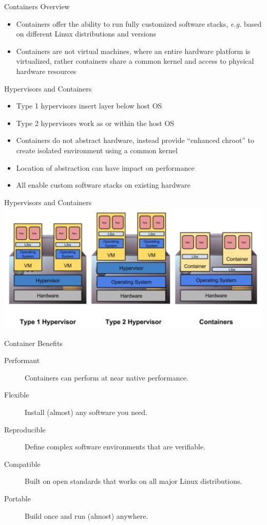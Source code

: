 \begin{frame}{Containers Overview}
\begin{itemize}
\item Containers offer the ability to run fully customized software stacks,
\textit{e.g.} based on different Linux distributions and versions
\item Containers are not virtual machines, where an entire hardware platform is
virtualized, rather containers share a common kernel and access to physical
hardware resources
\end{itemize}
\end{frame}

\begin{frame}{Hypervisors and Containers}
\begin{itemize}
\item Type 1 hypervisors insert layer below host OS
\item Type 2 hypervisors work as or within the host OS
\item Containers do not abstract hardware, instead provide ``enhanced chroot'' to
create isolated environment using a common kernel
\item Location of abstraction can have impact on performance
\item All enable custom software stacks on existing hardware
\end{itemize}
\end{frame}

\begin{frame}{Hypervisors and Containers}
\includegraphics[height=0.8\textheight]{images/hypervisors_vs_containers.png}
\end{frame}

\begin{frame}{Container Benefits}
\begin{description}
\item[Performant] Containers can perform at near native performance.
\item[Flexible] Install (almost) any software you need.
\item[Reproducible] Define complex software environments that are verifiable.
\item[Compatible] Built on open standards that works on all major Linux distributions.
\item[Portable] Build once and run (almost) anywhere.
\end{description}
\end{frame}

